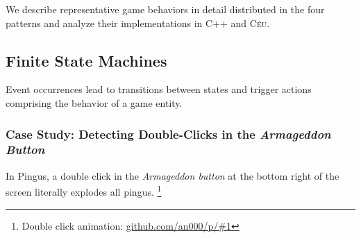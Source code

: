 \documentclass[10pt, conference, compsocconf]{IEEEtran}
\newcommand{\CEU}{\textsc{C\'{e}u}\xspace}
\begin{document}
We describe representative game behaviors in detail distributed in the four
patterns and analyze their implementations in C++ and \CEU.%

\subsection{Finite State Machines}
\label{sec.pats.fsms}

    Event occurrences lead to transitions between states and trigger actions
    comprising the behavior of a game entity.

\subsubsection{Case Study: Detecting Double-Clicks in the \emph{Armageddon Button}}


In Pingus, a double click in the \emph{Armageddon button} at the bottom right
of the screen literally explodes all pingus.%
\footnote{Double click animation: \url{github.com/an000/p/#1} }
\end{document}
